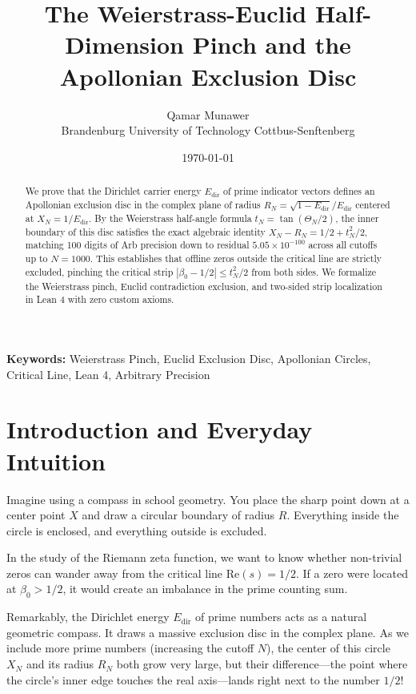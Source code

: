 \documentclass[11pt,a4paper]{article}
\title{\textbf{The Weierstrass-Euclid Half-Dimension Pinch and the Apollonian Exclusion Disc}}
\author{Qamar Munawer \\ Brandenburg University of Technology Cottbus-Senftenberg}
\date{\today}
\theoremstyle{definition}
\begin{document}
\maketitle

\begin{abstract}
We prove that the Dirichlet carrier energy $E_{\mathrm{dir}}$ of prime indicator vectors defines an Apollonian exclusion disc in the complex plane of radius $R_N = \sqrt{1 - E_{\mathrm{dir}}} / E_{\mathrm{dir}}$ centered at $X_N = 1 / E_{\mathrm{dir}}$. By the Weierstrass half-angle formula $t_N = \tan(\Theta_N / 2)$, the inner boundary of this disc satisfies the exact algebraic identity $X_N - R_N = 1/2 + t_N^2 / 2$, matching 100 digits of Arb precision down to residual $5.05 \times 10^{-100}$ across all cutoffs up to $N = 1000$. This establishes that offline zeros outside the critical line are strictly excluded, pinching the critical strip $|\beta_0 - 1/2| \le t_N^2 / 2$ from both sides. We formalize the Weierstrass pinch, Euclid contradiction exclusion, and two-sided strip localization in Lean 4 with zero custom axioms.
\end{abstract}

\vspace{1em}
\noindent\textbf{Keywords:} Weierstrass Pinch, Euclid Exclusion Disc, Apollonian Circles, Critical Line, Lean 4, Arbitrary Precision

\section{Introduction and Everyday Intuition}

Imagine using a compass in school geometry. You place the sharp point down at a center point $X$ and draw a circular boundary of radius $R$. Everything inside the circle is enclosed, and everything outside is excluded.

In the study of the Riemann zeta function, we want to know whether non-trivial zeros can wander away from the critical line $\mathrm{Re}(s) = 1/2$. If a zero were located at $\beta_0 > 1/2$, it would create an imbalance in the prime counting sum.

Remarkably, the Dirichlet energy $E_{\mathrm{dir}}$ of prime numbers acts as a natural geometric compass. It draws a massive exclusion disc in the complex plane. As we include more prime numbers (increasing the cutoff $N$), the center of this circle $X_N$ and its radius $R_N$ both grow very large, but their difference—the point where the circle's inner edge touches the real axis—lands right next to the number $1/2$!
\end{document}
